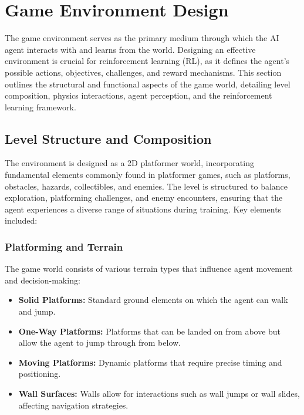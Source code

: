 \documentclass[12pt,oneside,openright,a4paper]{cpe-english-project}
\begin{document}
\section{Game Environment Design}
The game environment serves as the primary medium through which the AI agent interacts with and learns from the world. Designing an effective environment is crucial for reinforcement learning (RL), as it defines the agent’s possible actions, objectives, challenges, and reward mechanisms. This section outlines the structural and functional aspects of the game world, detailing level composition, physics interactions, agent perception, and the reinforcement learning framework.
\subsection{Level Structure and Composition}
The environment is designed as a 2D platformer world, incorporating fundamental elements commonly found in platformer games, such as platforms, obstacles, hazards, collectibles, and enemies. The level is structured to balance exploration, platforming challenges, and enemy encounters, ensuring that the agent experiences a diverse range of situations during training.
Key elements included:
\subsubsection{Platforming and Terrain}
The game world consists of various terrain types that influence agent movement and decision-making:
\begin{itemize}
\item  \textbf{Solid Platforms:} Standard ground elements on which the agent can walk and jump.
\item  \textbf{One-Way Platforms:} Platforms that can be landed on from above but allow the agent to jump through from below.
\item  \textbf{Moving Platforms:} Dynamic platforms that require precise timing and positioning.
\item  \textbf{Wall Surfaces:} Walls allow for interactions such as wall jumps or wall slides, affecting navigation strategies.
\end{itemize}
\end{document}
